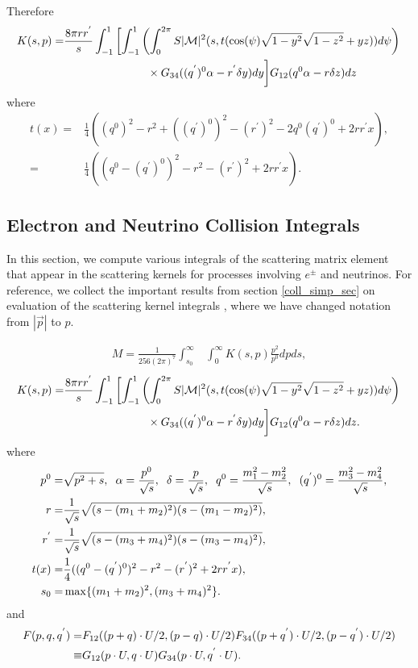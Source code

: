 Therefore 
\begin{align}
K(s,p)=&\frac{8\pi rr^{'}}{s}\int_{-1}^1 \left[\int_{-1}^1\left(\int_0^{2\pi} S |\mathcal{M}|^2 (s,t(\cos(\psi)\sqrt{1-y^2}\sqrt{1-z^2}+yz))d\psi\right)\right.\\
&\hspace{26mm}\times G_{34}((q^{'})^0\alpha-r^{'}\delta y) dy\bigg] G_{12}(q^0\alpha-r\delta z)dz
\end{align}
where
\begin{align}\label{t_def}
t(x)=&\frac{1}{4}((q^0)^2-r^2+((q^{'})^0)^2-(r^{'})^2-2q^0(q^{'})^0+2rr^{'}x),\\
=&\frac{1}{4}((q^0-(q^{'})^0)^2-r^2-(r^{'})^2+2rr^{'}x).
\end{align}


\subsection{Electron and Neutrino Collision Integrals}\label{nu_matrix_elements}
In this section, we compute various integrals of the scattering matrix element that appear in the scattering kernels for processes involving $e^\pm$ and neutrinos.  For reference, we collect the important results from section \ref{coll_simp_sec} on evaluation of the scattering kernel integrals , where we have changed notation from $|\vec p|$ to $p$.

\begin{align}\label{M_simp}
M=\frac{1}{256(2\pi)^7 }\int_{s_0}^\infty&\int_0^\infty K(s,p)\frac{ p^2}{p^0}dpds,
\end{align}
\begin{align}\label{matrix_elem_int}
K(s,p)=&\frac{8\pi rr^{'}}{s}\int_{-1}^1 \left[\int_{-1}^1\left(\int_0^{2\pi} S |\mathcal{M}|^2 (s,t(\cos(\psi)\sqrt{1-y^2}\sqrt{1-z^2}+yz))d\psi\right)\right.\\
&\hspace{26mm}\times G_{34}((q^{'})^0\alpha-r^{'}\delta y) dy\bigg] G_{12}(q^0\alpha-r\delta z)dz.
\end{align}
where
\begin{align}\label{t_def}
p^0=&\sqrt{p^2+s},\hspace{2mm} \alpha=\frac{p^0}{\sqrt{s}}, \hspace{2mm} \delta=\frac{p}{\sqrt{s}},\hspace{2mm}q^{0}=\frac{m_1^2-m_2^2}{\sqrt{s}},\hspace{2mm}(q^{'})^{0}=\frac{m_3^2-m_4^2}{\sqrt{s}},\\
r=&\frac{1}{\sqrt{s}}\sqrt{(s-(m_1+m_2)^2)(s-(m_1-m_2)^2)},\\
 r^{'}=&\frac{1}{\sqrt{s}}\sqrt{(s-(m_3+m_4)^2)(s-(m_3-m_4)^2)},\\
t(x)=&\frac{1}{4}((q^0-(q^{'})^0)^2-r^2-(r^{'})^2+2rr^{'}x),\\
s_0=&\max\{(m_1+m_2)^2,(m_3+m_4)^2\}.
\end{align}
and
\begin{align}
 F(p,q,q^{'})=&F_{12}((p+q)\cdot U/2,(p-q)\cdot U/2)F_{34}((p+q^{'})\cdot U/2,(p-q^{'})\cdot U/2)\\
\equiv &G_{12}(p\cdot U,q\cdot U)G_{34}(p\cdot U,q^{'}\cdot U)\notag.
\end{align}

